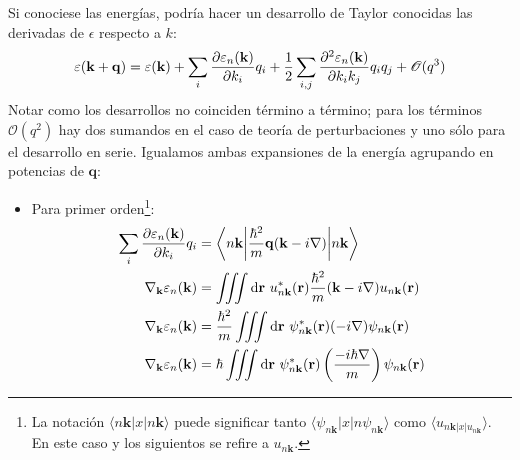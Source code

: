 Si conociese las energías, podría hacer un desarrollo de Taylor
conocidas las derivadas de $\epsilon$ respecto a $k$:
\begin{equation}
  \varepsilon(\mathbf{k}+\mathbf{q}) = \varepsilon(\mathbf{k}) +
  \sum_{i} \frac{\partial \varepsilon_n(\mathbf{k})}{\partial k_i} q_i + \frac{1}{2}
  \sum_{i,j} \frac{\partial ^2 \varepsilon_n(\mathbf{k})}{\partial k_i k_j} q_i q_j + \mathcal{O}(q^3)
\end{equation}
Notar como los desarrollos no coinciden término a término; para los
términos $\mathcal{O}(q^2)$ hay dos sumandos en el caso de teoría de
perturbaciones y uno sólo para el desarrollo en serie. Igualamos ambas
expansiones de la energía agrupando en potencias de $\mathbf{q}$:

\begin{itemize}
\item Para primer orden\footnote{La notación $\langle n \mathbf{k} | x
    | n \mathbf{k}\rangle $ puede significar tanto $\langle \psi_{n \mathbf{k}} | x
    | n \psi_{n \mathbf{k}}\rangle$ como $\langle u_{n \mathbf{k} | x |
      u_{n \mathbf{k}}}\rangle$. En este caso y los siguientos se
    refire a $u_{n \mathbf{k}}$.}:
  \begin{equation}
\begin{split}
  \sum_{i} \frac{\partial \varepsilon_n (\mathbf{k})}{\partial k_i} q_i &= \bigg \langle n
                                                         \mathbf{k}
                                                         \bigg |
                                                         \frac{\hbar^2}{m}
                                                         \mathbf{q}(\mathbf{k}- i\nabla)\bigg
                                                         | n \mathbf{k}
                                                         \bigg\rangle \\
\nabla_\mathbf{k} \varepsilon_n (\mathbf{k}) &= \iiint
  \text{d}\mathbf{r}\ u_{n \mathbf{k}}^*(\mathbf{r}) \frac{\hbar^2}{m}
  (\mathbf{k}-i \nabla) u_{n \mathbf{k}} (\mathbf{r}) \\
\nabla_\mathbf{k} \varepsilon_n (\mathbf{k}) &= \frac{\hbar^2}{m} \iiint
  \text{d}\mathbf{r}\ \psi_{n \mathbf{k}}^*(\mathbf{r})
  (-i \nabla) \psi_{n \mathbf{k}} (\mathbf{r}) \\
\nabla_\mathbf{k} \varepsilon_n (\mathbf{k}) &= \hbar \iiint
  \text{d}\mathbf{r}\ \psi_{n \mathbf{k}}^*(\mathbf{r})
  \left( \frac{-i \hbar \nabla}{m} \right) \psi_{n \mathbf{k}} (\mathbf{r})
\end{split}
  \end{equation}

\end{itemize}
